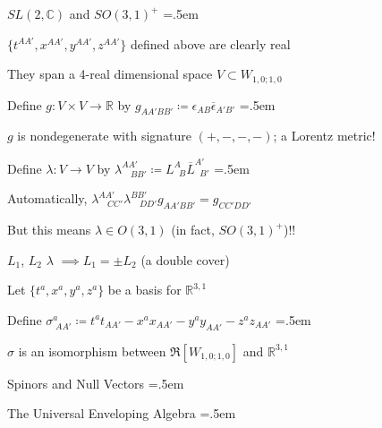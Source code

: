 \documentclass[xcolor={dvipsnames}]{beamer}
\let\olditemize=\itemize
\let\endolditemize=\enditemize
\renewenvironment{itemize}{\olditemize \itemsep=.5em }{\endolditemize}
\begin{document}
\begin{frame}{$SL(2, \mathbb{C})$ and $SO(3, 1)^+$}
    \begin{itemize}
        \item<1-> $\{t^{AA'}, x^{AA'}, y^{AA'}, z^{AA'}\}$ defined above are clearly real
        \item<2-> They span a 4-real dimensional space $V \subset W_{1,0;1,0}$
        \item<3-> Define $g:V\times V \rightarrow \mathbb{R}$ by $g_{AA'BB'} \coloneqq \epsilon_{AB}\overline{\epsilon}_{A'B'}$
        \begin{itemize}
            \item<4-> $g$ is nondegenerate with signature $(+, -, -, -)$; a Lorentz metric!
        \end{itemize}
        \item<5-> Define $\lambda: V \rightarrow V$ by $\lambda_{\quad BB'}^{AA'} \coloneqq L_{\;\;B}^A \overline{L}_{\;\;B'}^{A'}$
        \begin{itemize}
            \item<6-> Automatically, $\lambda_{\quad CC'}^{AA'}\lambda_{\quad DD'}^{BB'} g_{AA'BB'} = g_{CC'DD'}$
            \item<7-> But this means $\lambda \in O(3, 1)$ (in fact, $SO(3, 1)^+$)!!
            \item<8-> $L_1$, $L_2$ \textrightarrow\; $\lambda$ $\implies L_1 = \pm L_2$ (a double cover)
        \end{itemize}
        \item<9-> Let $\{t^a, x^a, y^a, z^a \}$ be a basis for $\mathbb{R}^{3,1}$
        \item<10-> Define $\sigma_{\;AA'}^a \coloneqq t^at_{AA'} - x^ax_{AA'} - y^ay_{AA'} - z^az_{AA'}$
        \begin{itemize}
            \item<11-> $\sigma$ is an isomorphism between $\Re[W_{1,0;1,0}]$ and $\mathbb{R}^{3,1}$
        \end{itemize}
    \end{itemize}
\end{frame}

\begin{frame}{Spinors and Null Vectors}
    \begin{itemize}
        \item<2->
    \end{itemize}    
\end{frame}

\begin{frame}{The Universal Enveloping Algebra}
    \begin{itemize}
        \item<2->
    \end{itemize}
\end{frame}
\end{document}
